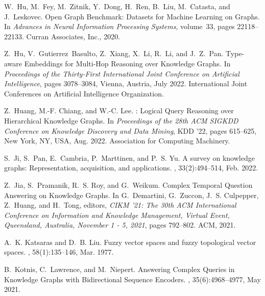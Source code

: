 \documentclass[11pt]{article}
\begin{document}
\begin{thebibliography}{10}
\begin{small}
W.~Hu, M.~Fey, M.~Zitnik, Y.~Dong, H.~Ren, B.~Liu, M.~Catasta, and J.~Leskovec.
\newblock Open {{Graph Benchmark}}: {{Datasets}} for {{Machine Learning}} on
{{Graphs}}.
\newblock In {\em Advances in {{Neural Information Processing Systems}}},
volume~33, pages 22118--22133. {Curran Associates, Inc.}, 2020.

Z.~Hu, V.~Gutierrez~Basulto, Z.~Xiang, X.~Li, R.~Li, and J.~Z.~Pan.
\newblock Type-aware {{Embeddings}} for {{Multi-Hop Reasoning}} over
{{Knowledge Graphs}}.
\newblock In {\em Proceedings of the {{Thirty-First International Joint
			Conference}} on {{Artificial Intelligence}}}, pages 3078--3084, {Vienna,
	Austria}, July 2022. {International Joint Conferences on Artificial
	Intelligence Organization}.

Z.~Huang, M.-F. Chiang, and W.-C. Lee.
: {{Logical Query Reasoning}} over {{Hierarchical Knowledge
		Graphs}}.
\newblock In {\em Proceedings of the 28th {{ACM SIGKDD Conference}} on
	{{Knowledge Discovery}} and {{Data Mining}}}, {{KDD}} '22, pages 615--625,
{New York, NY, USA}, Aug. 2022. {Association for Computing Machinery}.

S.~Ji, S.~Pan, E.~Cambria, P.~Marttinen, and P.~S. Yu.
\newblock A survey on knowledge graphs: Representation, acquisition, and
applications.
,
33(2):494--514, Feb. 2022.

Z.~Jia, S.~Pramanik, R.~S. Roy, and G.~Weikum.
\newblock Complex {{Temporal Question Answering}} on {{Knowledge Graphs}}.
\newblock In G.~Demartini, G.~Zuccon, J.~S. Culpepper, Z.~Huang, and H.~Tong,
editors, {\em {{CIKM}} '21: {{The}} 30th {{ACM International Conference}} on
	{{Information}} and {{Knowledge Management}}, {{Virtual Event}},
	{{Queensland}}, {{Australia}}, {{November}} 1 - 5, 2021}, pages 792--802.
{ACM}, 2021.

A.~K. Katsaras and D.~B. Liu.
\newblock Fuzzy vector spaces and fuzzy topological vector spaces.
,
58(1):135--146, Mar. 1977.

B.~Kotnis, C.~Lawrence, and M.~Niepert.
\newblock Answering {{Complex Queries}} in {{Knowledge Graphs}} with
{{Bidirectional Sequence Encoders}}.
,
35(6):4968--4977, May 2021.


\end{small}
\end{thebibliography}
\end{document}

